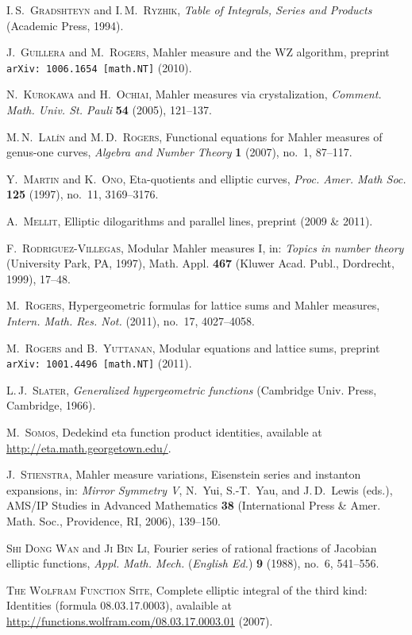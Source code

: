 \documentclass[12pt,reqno]{amsart}
\theoremstyle{remark}
\begin{document}
\begin{thebibliography}{99}
\textsc{I.\,S.~Gradshteyn} and \textsc{I.\,M.~Ryzhik},
\emph{Table of Integrals, Series and Products} (Academic Press, 1994).

\textsc{J.~Guillera} and \textsc{M.~Rogers},
Mahler measure and the WZ algorithm,
preprint \texttt{arXiv:\,1006.1654 [math.NT]} (2010).

\textsc{N.~Kurokawa} and \textsc{H.~Ochiai},
Mahler measures via crystalization,
\emph{Comment. Math. Univ. St. Pauli} \textbf{54} (2005), 121--137.

\textsc{M.\,N.~Lal\'\i n} and \textsc{M.\,D.~Rogers},
Functional equations for Mahler measures of genus-one curves,
\emph{Algebra and Number Theory} \textbf{1} (2007), no.~1, 87--117.

\textsc{Y.~Martin} and \textsc{K.~Ono},
Eta-quotients and elliptic curves,
\emph{Proc. Amer. Math Soc.} \textbf{125} (1997), no.~11, 3169--3176.

\textsc{A.~Mellit},
Elliptic dilogarithms and parallel lines,
preprint (2009 \& 2011).

\textsc{F.~Rodriguez-Villegas},
Modular Mahler measures I,
in: \emph{Topics in number theory} (University Park, PA, 1997),
Math. Appl. \textbf{467} (Kluwer Acad. Publ., Dordrecht, 1999), 17--48.

\textsc{M.~Rogers},
Hypergeometric formulas for lattice sums and Mahler measures,
\emph{Intern. Math. Res. Not.} (2011), no.~17, 4027--4058.

\textsc{M.~Rogers} and \textsc{B.~Yuttanan}, Modular equations and
lattice sums, preprint \texttt{arXiv:\,1001.4496 [math.NT]}
(2011).

\textsc{L.\,J.~Slater},
\emph{Generalized hypergeometric functions}
(Cambridge Univ. Press, Cambridge, 1966).

\textsc{M.~Somos},
Dedekind eta function product identities,
available at \url{http://eta.math.georgetown.edu/}.

\textsc{J.~Stienstra},
Mahler measure variations, Eisenstein series and instanton expansions,
in: \emph{Mirror Symmetry V},
N.~Yui, S.-T.~Yau, and J.\,D.~Lewis (eds.),
AMS/IP Studies in Advanced Mathematics \textbf{38}
(International Press \& Amer. Math. Soc., Providence, RI, 2006), 139--150.

\textsc{Shi Dong Wan} and \textsc{Ji Bin Li},
Fourier series of rational fractions of Jacobian elliptic functions,
\emph{Appl. Math. Mech.} (\emph{English Ed.}) \textbf{9} (1988), no.~6, 541--556.

\textsc{The Wolfram Function Site},
Complete elliptic integral of the third kind: Identities (formula 08.03.17.0003),
avalaible at \url{http://functions.wolfram.com/08.03.17.0003.01} (2007).

\end{thebibliography}
\end{document}
